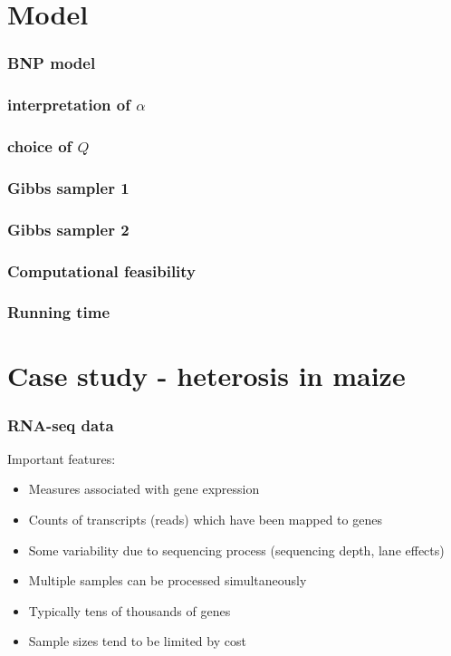 \documentclass{beamer}
\begin{document}
\section{Model}



\begin{frame}
\frametitle{BNP model}
\end{frame}

\begin{frame}
\frametitle{interpretation of $\alpha$}
\end{frame}

\begin{frame}
\frametitle{choice of $Q$}
\end{frame}

\begin{frame}
\frametitle{Gibbs sampler 1}
\end{frame}

\begin{frame}
\frametitle{Gibbs sampler 2}
\end{frame}

\begin{frame}
\frametitle{Computational feasibility}
\end{frame}

\begin{frame}
\frametitle{Running time}
\end{frame}

\section{Case study - heterosis in maize}


\begin{frame}
\frametitle{RNA-seq data}

Important features:
  
  \begin{itemize}
\item Measures associated with gene expression
\item Counts of transcripts (reads) which have been mapped to genes
\item Some variability due to sequencing process (sequencing depth, lane effects)
\item Multiple samples can be processed simultaneously
\item Typically tens of thousands of genes
\item Sample sizes tend to be limited by cost

\end{itemize}
\vspace{1cm}
{\small \citep{datta2014}}
\end{frame}
\end{document}

